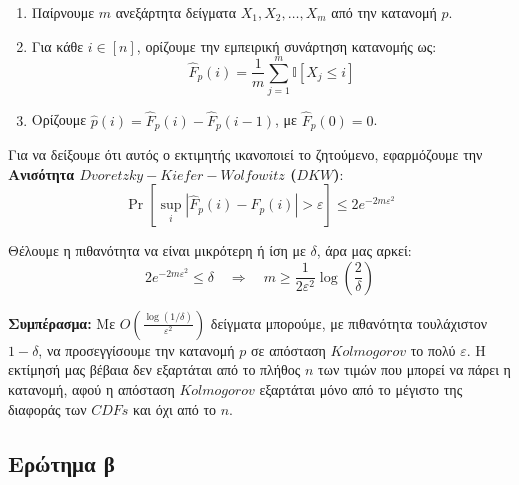 \documentclass[12pt]{article}
\begin{document}
\begin{enumerate}
  \item Παίρνουμε $m$ ανεξάρτητα δείγματα $X_1, X_2, \dots, X_m$ από την κατανομή $p$.
  \item Για κάθε $i \in [n]$, ορίζουμε την εμπειρική συνάρτηση κατανομής ως:
  \[
  \hat{F}_p(i) = \frac{1}{m} \sum_{j = 1}^m \mathbb{I}[X_j \leq i]
  \]
  \item Ορίζουμε $\hat{p}(i) = \hat{F}_p(i) - \hat{F}_p(i - 1)$, με $\hat{F}_p(0) = 0$.
\end{enumerate}

Για να δείξουμε ότι αυτός ο εκτιμητής ικανοποιεί το ζητούμενο, εφαρμόζουμε την \textbf{Ανισότητα $Dvoretzky-Kiefer-Wolfowitz$ ($DKW$)}:
\[
\Pr\left[ \sup_{i} |\hat{F}_p(i) - F_p(i)| > \varepsilon \right] \leq 2 e^{-2m \varepsilon^2}
\]

Θέλουμε η πιθανότητα να είναι μικρότερη ή ίση με $\delta$, άρα μας αρκεί:
\[
2 e^{-2m \varepsilon^2} \leq \delta \quad \Rightarrow \quad m \geq \frac{1}{2 \varepsilon^2} \log \left( \frac{2}{\delta} \right)
\]

\textbf{Συμπέρασμα:} Με $O\left( \frac{\log(1/\delta)}{\varepsilon^2} \right)$ δείγματα μπορούμε, με πιθανότητα τουλάχιστον $1 - \delta$, να προσεγγίσουμε την κατανομή $p$ σε απόσταση $Kolmogorov$ το πολύ $\varepsilon$. Η εκτίμησή μας βέβαια δεν εξαρτάται από το πλήθος $n$ των τιμών που μπορεί να πάρει η κατανομή, αφού η απόσταση $Kolmogorov$ εξαρτάται μόνο από το μέγιστο της διαφοράς των $CDFs$ και όχι από το $n$.

\vspace{1em}

\subsection*{Ερώτημα β}
\end{document}
